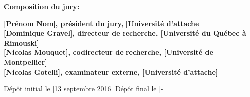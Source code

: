 \thispagestyle{empty}

\null
\vfill
\noindent \textbf{Composition du jury:}\\
\vspace{1cm}

\begin{singlespace}
  \noindent \textbf{[Prénom Nom], président du jury, [Université d’attache]}\\

  \noindent \textbf{[Dominique Gravel], directeur de recherche, [Université du Québec à Rimouski]}\\

  \noindent \textbf{[Nicolas Mouquet], codirecteur de recherche, [Université de Montpellier]}\\

  \noindent \textbf{[Nicolas Gotelli], examinateur externe, [Université d’attache]}\\
\end{singlespace}

\vspace{2cm}
\noindent Dépôt initial le [13 septembre 2016]
\hspace{3cm}
Dépôt final le [-]


\cleardoublepage
